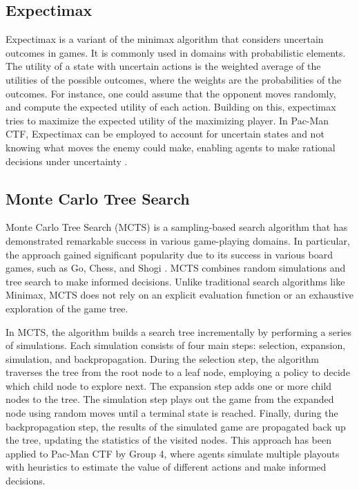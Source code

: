 \documentclass[a4paper,12pt]{article}
\begin{document}
\subsection{Expectimax}
\label{subsec:expectimax}

Expectimax is a variant of the minimax algorithm that considers uncertain outcomes in games. It is commonly used in domains with probabilistic elements. The utility of a state with uncertain actions is the weighted average of the utilities of the possible outcomes, where the weights are the probabilities of the outcomes. For instance, one could assume that the opponent moves randomly, and compute the expected utility of each action. Building on this, expectimax tries to maximize the expected utility of the maximizing player. In Pac-Man CTF, Expectimax can be employed to account for uncertain states and not knowing what moves the enemy could make, enabling agents to make rational decisions under uncertainty \cite{RIVEST198777}.

\subsection{Monte Carlo Tree Search}
\label{subsec:mcts}

Monte Carlo Tree Search (MCTS) is a sampling-based search algorithm that has demonstrated remarkable success in various game-playing domains. In particular, the approach gained significant popularity due to its success in various board games, such as Go, Chess, and Shogi \cite{GELLY20111856}. MCTS combines random simulations and tree search to make informed decisions. Unlike traditional search algorithms like Minimax, MCTS does not rely on an explicit evaluation function or an exhaustive exploration of the game tree.

In MCTS, the algorithm builds a search tree incrementally by performing a series of simulations. Each simulation consists of four main steps: selection, expansion, simulation, and backpropagation. During the selection step, the algorithm traverses the tree from the root node to a leaf node, employing a policy to decide which child node to explore next. The expansion step adds one or more child nodes to the tree. The simulation step plays out the game from the expanded node using random moves until a terminal state is reached. Finally, during the backpropagation step, the results of the simulated game are propagated back up the tree, updating the statistics of the visited nodes. This approach has been applied to Pac-Man CTF by Group 4, where agents simulate multiple playouts with heuristics to estimate the value of different actions and make informed decisions.
\end{document}
